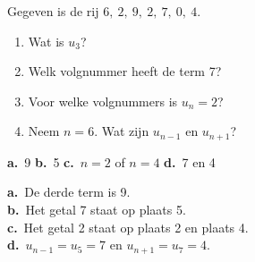 
\begin{oefeningen}
\begin{oefening}[1]\label{oef:h1-termen}
Gegeven is de rij $6,\ 2,\ 9,\ 2,\ 7,\ 0,\ 4$.
\begin{enumerate}
  \item Wat is $u_3$?
  \item Welk volgnummer heeft de term 7?
  \item Voor welke volgnummers is $u_n = 2$?
  \item Neem $n = 6$. Wat zijn $u_{n-1}$ en $u_{n+1}$?
\end{enumerate}
\begin{solution}
\textbf{a.}~9 \quad \textbf{b.}~5 \quad \textbf{c.}~$n=2$ of $n=4$ \quad \textbf{d.}~7 en 4
\end{solution}
\begin{fullsolution}
\textbf{a.}~De derde term is 9.\\
\textbf{b.}~Het getal 7 staat op plaats 5.\\
\textbf{c.}~Het getal 2 staat op plaats 2 en plaats 4.\\
\textbf{d.}~$u_{n-1}=u_5=7$ en $u_{n+1}=u_7=4$.
\end{fullsolution}
\end{oefening}


\end{oefeningen}
